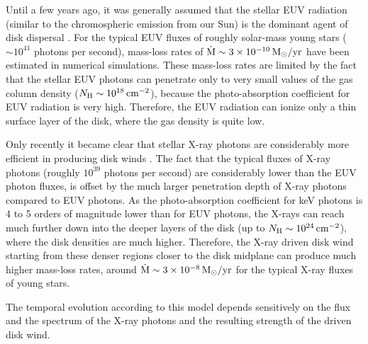 \documentclass[10pt,fleqn,twoside,a4paper]{article}
\begin{document}
Until a few years ago, it was generally assumed that the 
stellar EUV radiation (similar to the chromospheric emission from 
our Sun) is the dominant agent of disk dispersal \citep{Alexander06}.
For the typical EUV fluxes of roughly solar-mass young stars 
($\sim 10^{41}$ photons per second), mass-loss rates of 
$ \dot{\rm M} \sim 3 \times 10^{-10}\,\rm M_\odot/yr$
have been estimated in numerical simulations.
These mass-loss rates are limited by the fact that the stellar EUV photons
can penetrate only to very small values of the gas column density
($N_{\rm H} \sim  10^{18}\,\rm cm^{-2}$), 
because the photo-absorption coefficient for EUV radiation is very high. Therefore,
the EUV radiation  
can ionize only a thin surface layer of the disk, where the 
gas density is quite low. 


Only recently it became clear that stellar X-ray photons 
are considerably more efficient in producing 
disk winds \citep{Ercolano08a,Ercolano08b,Ercolano09}.
The fact that the typical fluxes of X-ray photons (roughly
 $10^{39}$ photons per second) are considerably lower than the EUV photon fluxes,
is offset by the much larger 
penetration depth of X-ray photons compared to EUV photons.
As the photo-absorption coefficient for keV photons
is 4 to 5  orders of magnitude lower than for EUV photons, the
X-rays can reach much further down into the deeper layers of the
disk (up to $N_{\rm H} \sim  10^{24}\,\rm cm^{-2}$), 
where the disk densities are much higher. 
Therefore, the X-ray driven 
disk wind starting from these denser regions closer to the
disk midplane can produce much higher mass-loss rates,
around  $ \dot{\rm M} \sim 3 \times 10^{-8}\,\rm M_\odot/yr$
for the typical X-ray fluxes of young stars.


The temporal evolution according to this model depends sensitively
on the flux and the spectrum of the X-ray photons
  and the resulting strength of the
driven disk wind.
\end{document}
